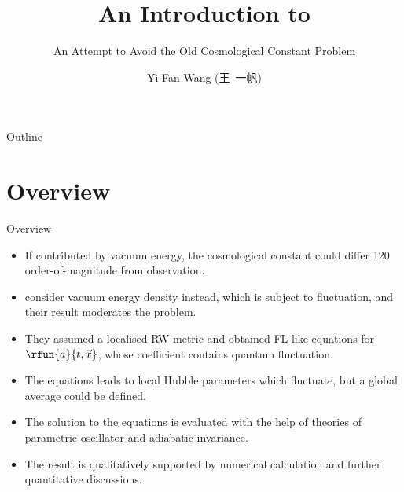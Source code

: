 \documentclass{beamer}
\title%
{An Introduction to \cite{Wang2017}}
\subtitle{An Attempt to Avoid the Old Cosmological Constant Problem}
\author[Wang] %
{Yi-Fan Wang (王\ 一帆)}
\institute[Uni zu Köln] %
{
	Institut für Theoretische Physik\\
	Universität zu Köln}
\begin{document}
\begin{frame}
  \titlepage
\end{frame}

\begin{frame}{Outline}
  \tableofcontents
\end{frame}





\section{Overview}

\begin{frame}{Overview}
\begin{itemize}
\item If contributed by vacuum energy, the cosmological constant could
\alert{differ \num{120} order-of-magnitude} from observation.
\item \citeauthor{Wang2017} consider vacuum energy \alert{density} instead, 
which is subject to \alert{fluctuation}, and their result moderates the problem.
\item They assumed a localised RW metric and obtained FL-like equations for 
$\rfun{a}{t,\vec{x}}$, whose coefficient contains quantum fluctuation.
\item The equations leads to local Hubble parameters which fluctuate, but a
global average could be defined.
\item The solution to the equations is evaluated with the help of theories of
parametric oscillator and adiabatic invariance.
\item The result is qualitatively supported by numerical calculation and 
further quantitative discussions.
\end{itemize}

\end{frame}
\end{document}
